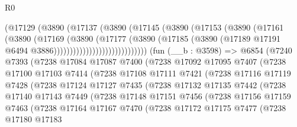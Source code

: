 \begin{lexlean}{R0}
\begin{coremodule}
                            (@17129
                              (@3890
                                (@17137
                                  (@3890
                                    (@17145
                                      (@3890
                                        (@17153
                                          (@3890
                                            (@17161
                                              (@3890
                                                (@17169
                                                  (@3890
                                                    (@17177
                                                      (@3890
                                                        (@17185
                                                          (@3890
                                                            (@17189
                                                              @17191
                                                              @6494
                                                              @3886)))))))))))))))))))))))))))))
    (fun (__b : @3598) =>
    @6854
      (@7240
        @7393
        (@7238
          @17084
          @17087
          @7400
          (@7238
            @17092
            @17095
            @7407
            (@7238
              @17100
              @17103
              @7414
              (@7238
                @17108
                @17111
                @7421
                (@7238
                  @17116
                  @17119
                  @7428
                  (@7238
                    @17124
                    @17127
                    @7435
                    (@7238
                      @17132
                      @17135
                      @7442
                      (@7238
                        @17140
                        @17143
                        @7449
                        (@7238
                          @17148
                          @17151
                          @7456
                          (@7238
                            @17156
                            @17159
                            @7463
                            (@7238
                              @17164
                              @17167
                              @7470
                              (@7238
                                @17172
                                @17175
                                @7477
                                (@7238
                                  @17180
                                  @17183

\end{coremodule}
\end{lexlean}
